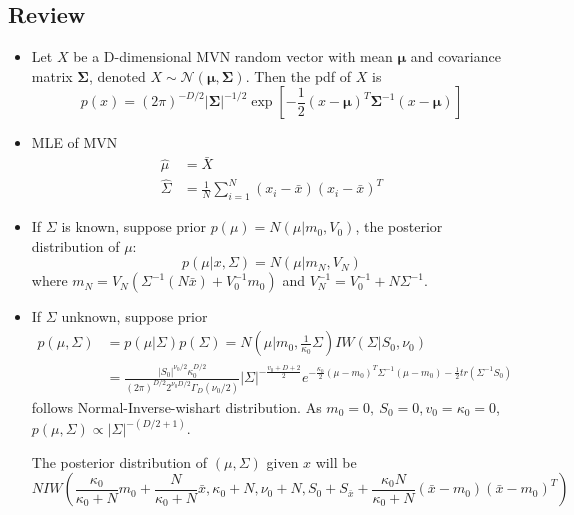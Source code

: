 \documentclass{harvardml}
\theoremstyle{definition}
\theoremstyle{plain}
\renewcommand{\v}[1]{\mathbf{#1}}
\begin{document}
\subsection{Review}
\begin{itemize}
\item Let $X$ be a D-dimensional MVN random vector with mean $\v\mu$ and covariance matrix $\v\Sigma$, denoted $X \sim \mathcal{N}\left(\v\mu,\v\Sigma\right)$. Then the pdf of $X$ is
$$ p(x) = \left(2\pi\right)^{-D/2} |\v\Sigma|^{-1/2} \exp{[-\frac{1}{2}(x-\v\mu)^T\v\Sigma^{-1}(x-\v\mu)]} $$
\item MLE of MVN
\begin{align*}
\hat \mu &=\bar X \\
\hat \Sigma &= \frac{1}{N}\sum_{i=1}^N(x_i - \bar x)(x_i - \bar x)^T
\end{align*}
\item If $\Sigma$ is known, suppose prior $p(\mu) = N(\mu|m_0, V_0)$, the posterior distribution of $\mu$: $$p(\mu| x, \Sigma) = N(\mu|m_N, V_N)$$
where $m_N  = V_N(\Sigma^{-1}(N\bar x) + V_0^{-1}m_0)$ and $ V_N^{-1} = V_0^{-1} + N\Sigma^{-1}$.
\item  If $\Sigma$ unknown, suppose prior 
\begin{align*}
p(\mu, \Sigma) &= p(\mu|\Sigma) p(\Sigma) = N(\mu|m_0, \frac{1}{\kappa_0}\Sigma) IW(\Sigma|S_0, \nu_0)  \\
&=  \frac{|S_0|^{\nu_0/2}\kappa_0^{D/2}}{(2\pi)^{D/2}2^{\nu_0D/2}\Gamma_D(\nu_0/2)}|\Sigma|^{-\frac{v_0 + D +2}{2}}e^{-\frac{\kappa_0}{2}(\mu - m_0)^T\Sigma^{-1}(\mu - m_0) - \frac12tr(\Sigma^{-1}S_0)}
\end{align*}
follows Normal-Inverse-wishart distribution. As $m_0 = 0,\ S_0 = 0, v_0 = \kappa_0 = 0 $, $p(\mu, \Sigma) \propto |\Sigma|^{-(D/2+1)}$.

The posterior distribution of $(\mu, \Sigma)$ given $x$ will be $$NIW(\frac{\kappa_0}{\kappa_0 + N} m_0 + \frac{N}{\kappa_0 + N} \bar x, \kappa_0 + N, \nu_0 + N, S_0 + S_{\bar x} + \frac{\kappa_0N}{\kappa_0 + N}(\bar x - m_0)(\bar x - m_0)^T)$$
\end{itemize}
\end{document}
